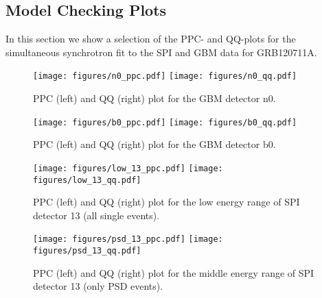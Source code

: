 \documentclass[twocolumn]{aa}
\begin{document}
\begin{appendix}
  \section{Model Checking Plots}
  \label{appendix1}
  In this section we show a selection of the PPC- and QQ-plots for the simultaneous synchrotron fit to the SPI and GBM data for GRB120711A.
  \begin{figure}[h]
    \begin{centering}
      \texttt{[image: figures/n0\_ppc.pdf]}
      \texttt{[image: figures/n0\_qq.pdf]}
      \caption{PPC (left) and QQ (right) plot for the GBM detector n0.}
      \label{fig:n0_model_check}
    \end{centering}
  \end{figure}
  \begin{figure}[h]
    \begin{centering}
      \texttt{[image: figures/b0\_ppc.pdf]}
      \texttt{[image: figures/b0\_qq.pdf]}
      \caption{PPC (left) and QQ (right) plot for the GBM detector b0.}
      \label{fig:b0_model_check}
    \end{centering}
  \end{figure}
  \begin{figure}[h]
    \begin{centering}
      \texttt{[image: figures/low\_13\_ppc.pdf]}
      \texttt{[image: figures/low\_13\_qq.pdf]}
      \caption{PPC (left) and QQ (right) plot for the low energy range of SPI detector 13 (all single events).}
      \label{fig:low_13_model_check}
    \end{centering}
  \end{figure}
  \begin{figure}[h]
    \begin{centering}
      \texttt{[image: figures/psd\_13\_ppc.pdf]}
      \texttt{[image: figures/psd\_13\_qq.pdf]}
      \caption{PPC (left) and QQ (right) plot for the middle energy range of SPI detector 13 (only PSD events).}
      \label{fig:psd_13_model_check}
    \end{centering}
  \end{figure}
\end{appendix}



\end{document}
